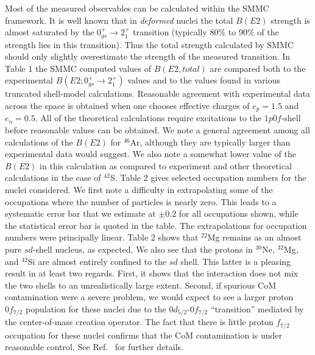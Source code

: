 \documentclass{article}
\begin{document}
Most of the measured observables can be calculated within the SMMC
framework.  It is well known that in {\it deformed} nuclei the total
$B(E2)$ strength is almost saturated by the $0^+_{gs} \rightarrow
2_1^+$ transition (typically 80\% to 90\% of the strength lies in this
transition).
Thus the total strength calculated by SMMC should only
slightly overestimate the strength of the measured transition.  In
Table 1 the SMMC computed values of $B(E2, total)$ are
compared both to the experimental $B(E2; 0^+_{gs} \rightarrow 2^+_1)$
values and to the values found in various truncated shell-model
calculations.  Reasonable agreement with experimental data across the
space is obtained when one chooses effective charges of $e_p=1.5$ and
$e_n=0.5$.
All of the theoretical
calculations require excitations to the $1p0f$-shell before reasonable
values can be obtained.  We note a general agreement among all
calculations of the $B(E2)$ for $^{46}$Ar, although they are typically
larger than experimental data would suggest. We also note a somewhat
lower value of the $B(E2)$ in this calculation as compared to
experiment and other theoretical calculations in the case of $^{42}$S.
Table 2 gives selected occupation numbers for the nuclei
considered.  We first note a difficulty in extrapolating some of the
occupations where the number of particles is nearly zero.  This leads
to a systematic error bar that we estimate at $\pm 0.2$ for all
occupations shown, while the statistical error bar is quoted in the
table. The extrapolations for occupation numbers were principally
linear. Table 2 shows that $^{22}$Mg remains as an almost
pure $sd$-shell nucleus, as expected.  We also see that the protons in
$^{30}$Ne, $^{32}$Mg, and $^{42}$Si are almost entirely confined to the
$sd$ shell.  This latter is a pleasing result in at least two regards.
First, it shows that the interaction does not mix the two shells to an
unrealistically large extent.  Second, if spurious CoM  contamination
were a severe problem, we would expect to see a larger proton
$0f_{7/2}$ population for these nuclei due to the $0d_{5/2}$-$0f_{7/2}$
``transition'' mediated by the center-of-mass creation operator.  The fact that
there is little proton $f_{7/2}$ occupation for these nuclei confirms
that the CoM contamination is under reasonable control.
See Ref.\ \cite{drhklz99} for further details.
\end{document}
